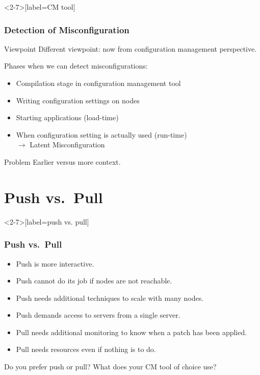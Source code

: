 \begin{frame}<2-7>[label=CM tool]
	\frametitle{Detection of Misconfiguration}

	\begin{alertblock}{Viewpoint}
	Different viewpoint: now from configuration management perspective.
	\end{alertblock}

	\pause

	Phases when we can detect misconfigurations:

	\pause
	\begin{itemize}[<+-| alert@+>]
	\item Compilation stage in configuration management tool
	\item Writing configuration settings on nodes
	\item Starting applications (load-time)
	\item When configuration setting is actually used (run-time) \\
		$\rightarrow$ Latent Misconfiguration
	\end{itemize}

	\pause[\thebeamerpauses]

	\begin{alertblock}{Problem}
	Earlier versus more context.
	\end{alertblock}
\end{frame}

\section{Push vs.\ Pull}

\begin{frame}<2-7>[label=push vs. pull]
	\frametitle{Push vs.\ Pull}

	\pause

	\begin{itemize}[<+-| alert@+>]
	\item Push is more interactive.
	\item Push cannot do its job if nodes are not reachable.
	\item Push needs additional techniques to scale with many nodes.
	\item Push demands access to servers from a single server.
	\item Pull needs additional monitoring to know when a patch has been applied.
	\item Pull needs resources even if nothing is to do.
	\end{itemize}

	\pause[\thebeamerpauses]

	\begin{task}
	Do you prefer push or pull?
	What does your CM tool of choice use?
	\end{task}
\end{frame}

